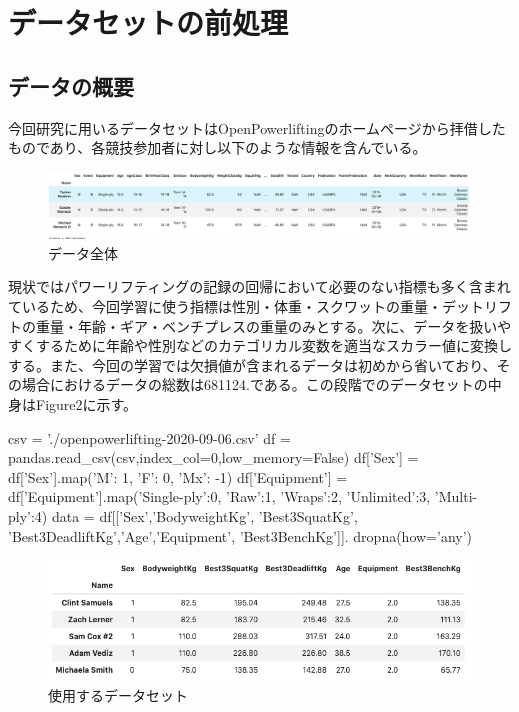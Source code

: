 \documentclass{report}
\begin{document}
\newpage
\section{データセットの前処理}


\subsection{データの概要}

今回研究に用いるデータセットはOpenPowerliftingのホームページから拝借したものであり、各競技参加者に対し以下のような情報を含んでいる。

\begin{figure}[H]
\begin{center}
\includegraphics[width=\linewidth]{data_head.png}
\caption{データ全体}
\end{center}
\end{figure}

現状ではパワーリフティングの記録の回帰において必要のない指標も多く含まれているため、今回学習に使う指標は性別・体重・スクワットの重量・デットリフトの重量・年齢・ギア・ベンチプレスの重量のみとする。次に、データを扱いやすくするために年齢や性別などのカテゴリカル変数を適当なスカラー値に変換しする。また、今回の学習では欠損値が含まれるデータは初めから省いており、その場合におけるデータの総数は681124.である。この段階でのデータセットの中身はFigure2に示す。
\\

\begin{python}[caption=必要なデータの選別]
csv = './openpowerlifting-2020-09-06.csv'
df = pandas.read_csv(csv,index_col=0,low_memory=False)
df['Sex'] = df['Sex'].map({'M': 1, 'F': 0, 'Mx': -1})
df['Equipment'] = df['Equipment'].map({'Single-ply':0, 
'Raw':1, 'Wraps':2, 'Unlimited':3, 'Multi-ply':4})
data = df[['Sex','BodyweightKg', 'Best3SquatKg', 
'Best3DeadliftKg','Age','Equipment', 'Best3BenchKg']].
dropna(how='any')
\end{python}


\begin{figure}[H]
\begin{center}
\includegraphics[width=\linewidth]{data_trimed.png}
\caption{使用するデータセット}
\end{center}
\end{figure}
\end{document}
